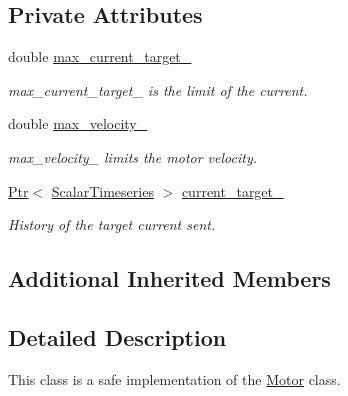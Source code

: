 \subsection*{Private Attributes}
\begin{DoxyCompactItemize}
\item 
\mbox{\label{classblmc__drivers_1_1SafeMotor_ae58230855ac502d9c702304d785eb833}} 
double \hyperlink{classblmc__drivers_1_1SafeMotor_ae58230855ac502d9c702304d785eb833}{max\+\_\+current\+\_\+target\+\_\+}
\begin{DoxyCompactList}\small\item\em max\+\_\+current\+\_\+target\+\_\+ is the limit of the current. \end{DoxyCompactList}\item 
\mbox{\label{classblmc__drivers_1_1SafeMotor_a1885b2a1c298765cae0a7ccda75d5f3f}} 
double \hyperlink{classblmc__drivers_1_1SafeMotor_a1885b2a1c298765cae0a7ccda75d5f3f}{max\+\_\+velocity\+\_\+}
\begin{DoxyCompactList}\small\item\em max\+\_\+velocity\+\_\+ limits the motor velocity. \end{DoxyCompactList}\item 
\mbox{\label{classblmc__drivers_1_1SafeMotor_af79e6910868177f18a498ea83b350e3f}} 
\hyperlink{classblmc__drivers_1_1MotorInterface_ae31f230b9da3674a05543023c90b124c}{Ptr}$<$ \hyperlink{classblmc__drivers_1_1MotorInterface_a49b8fc916b9f9debbd7b0988463db5cd}{Scalar\+Timeseries} $>$ \hyperlink{classblmc__drivers_1_1SafeMotor_af79e6910868177f18a498ea83b350e3f}{current\+\_\+target\+\_\+}
\begin{DoxyCompactList}\small\item\em History of the target current sent. \end{DoxyCompactList}\end{DoxyCompactItemize}
\subsection*{Additional Inherited Members}


\subsection{Detailed Description}
This class is a safe implementation of the \hyperlink{classblmc__drivers_1_1Motor}{Motor} class. 

